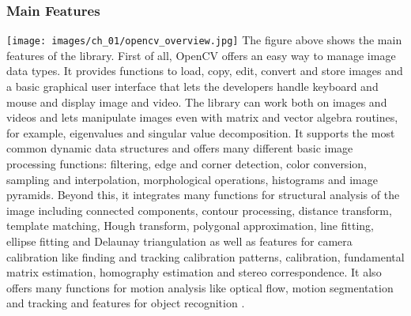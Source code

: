 	\subsubsection*{Main Features}
		\texttt{[image: images/ch\_01/opencv\_overview.jpg]}
	The figure above shows the main features of the library. First of all, OpenCV offers an easy way to manage image data types. It provides functions to load, copy, edit, convert and store images and a basic graphical user interface that lets the developers handle keyboard and mouse and display image and video. The library can work both on images and videos and lets manipulate images even with matrix and vector algebra routines, for example, eigenvalues and singular value decomposition. It supports the most common dynamic data structures and offers many different basic image processing functions: filtering, edge and corner detection, color conversion, sampling and interpolation, morphological operations, histograms and image pyramids. Beyond this, it integrates many functions for structural analysis of the image including connected components, contour processing, distance transform, template matching, Hough transform, polygonal approximation, line fitting, ellipse fitting and Delaunay triangulation as well as features for camera calibration like finding and tracking calibration patterns, calibration, fundamental matrix estimation, homography estimation and stereo correspondence. It also offers many functions for motion analysis like optical flow, motion segmentation and tracking and features for object recognition \cite{Agam2006}.
